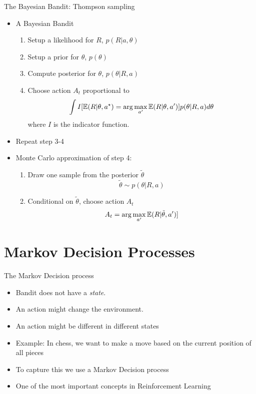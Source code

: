 \documentclass[10pt]{beamer}
\begin{document}
\begin{frame}{The Bayesian Bandit: Thompson sampling}

\begin{itemize}
\item A Bayesian Bandit
\begin{enumerate}
\item Setup a likelihood for $R$, $p(R|a,\theta)$
\item Setup a prior for $\theta$, $p(\theta)$
\item Compute posterior for $\theta$, $p(\theta|R, a)$
\item Choose action $A_t$ proportional to
\[
\int I[\operatorname{\mathbb{E}}(R|\theta,a^\star) = \arg \max_{a'} \operatorname{\mathbb{E}}(R|\theta,a')] p(\theta|R,a) d\theta
\]
where $I$ is the indicator function.
\end{enumerate}
\item Repeat step 3-4 \pause
\item Monte Carlo approximation of step 4:
\begin{enumerate}
\item Draw one sample from the posterior $\tilde{\theta}$
\[
\tilde{\theta} \sim p(\theta|R, a)
\]
\item Conditional on $\tilde{\theta}$, choose action $A_t$
\[
A_t = \arg \max_{a'} \operatorname{\mathbb{E}}(R|\tilde{\theta},a')]
\]
\end{enumerate}

\end{itemize}

\end{frame}




\section{Markov Decision Processes}
\frame{\sectionpage}


\begin{frame}{The Markov Decision process}

\begin{itemize}
\item Bandit does not have a \emph{state}.\pause
\item An action might {\color{uured}change} the environment.
\item An action might be different in different {\color{uured}states}\pause
\item {\color{uured}Example}: In chess, we want to make a move based on the current position of all pieces\pause
\item To capture this we use a {\color{uured}Markov Decision process}
\item One of the most important concepts in Reinforcement Learning
\end{itemize}

\end{frame}
\end{document}
